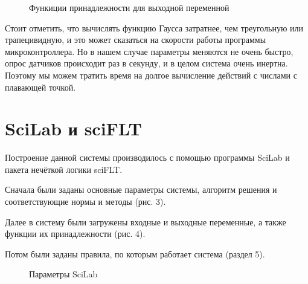 \documentclass[a4paper]{article}
\begin{document}
\begin{figure}[h]
    \caption{Функиции принадлежности для выходной переменной} 
\end{figure}

Стоит отметить, что вычислять функцию Гаусса затратнее, чем треугольную или
трапецивидную, и это может сказаться на скорости работы программы
микроконтроллера. Но в нашем случае параметры меняются не очень быстро,
опрос датчиков происходит раз в секунду, и в целом система очень инертна.
Поэтому мы можем тратить время на долгое вычисление действий с числами с
плавающей точкой.

\section{SciLab и sciFLT}
Построение данной системы производилось с помощью программы SciLab и пакета
нечёткой логики sciFLT.

Сначала были заданы основные параметры системы, алгоритм решения и
соответствующие нормы и методы (рис. 3).

Далее в систему были загружены входные и выходные переменные, а также
функции их принадлежности (рис. 4). 

Потом были заданы правила, по которым работает система (раздел 5).


\begin{figure}[h]
    \caption{Параметры SciLab} 
\end{figure}
\end{document}
